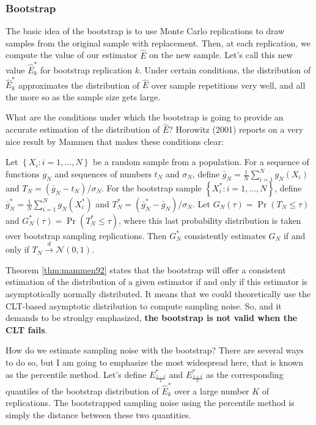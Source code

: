 \documentclass[]{book}
\theoremstyle{definition}
\theoremstyle{definition}
\theoremstyle{definition}
\theoremstyle{remark}
\let\BeginKnitrBlock\begin \let\EndKnitrBlock\end
\begin{document}
\hypertarget{bootstrap}{%
\subsubsection{Bootstrap}\label{bootstrap}}

The basic idea of the bootstrap is to use Monte Carlo replications to draw samples from the original sample with replacement.
Then, at each replication, we compute the value of our estimator \(\hat{E}\) on the new sample.
Let's call this new value \(\hat{E}^*_k\) for bootstrap replication \(k\).
Under certain conditions, the distribution of \(\hat{E}^*_k\) approximates the distribution of \(\hat{E}\) over sample repetitions very well, and all the more so as the sample size gets large.

What are the conditions under which the bootstrap is going to provide an accurate estimation of the distribution of \(\hat{E}\)?
Horowitz (2001) reports on a very nice result by Mammen that makes these conditions clear:

\BeginKnitrBlock{theorem}[Mammen (1992)]
\protect\hypertarget{thm:mammen92}{}{\label{thm:mammen92} \iffalse (Mammen (1992)) \fi{} }Let \(\left\{X_i:i=1,\dots,N\right\}\) be a random sample from a population.
For a sequence of functions \(g_N\) and sequences of numbers \(t_N\) and \(\sigma_N\), define \(\bar{g}_N=\frac{1}{N}\sum_{i=1}^Ng_N(X_i)\) and \(T_N=(\bar{g}_N-t_N)/\sigma_N\).
For the bootstrap sample \(\left\{X^*_i:i=1,\dots,N\right\}\), define \(\bar{g}^*_N=\frac{1}{N}\sum_{i=1}^Ng_N(X^*_i)\) and \(T^*_N=(\bar{g}^*_N-\bar{g}_N)/\sigma_N\).
Let \(G_N(\tau)=\Pr(T_N\leq\tau)\) and \(G^*_N(\tau)=\Pr(T^*_N\leq\tau)\), where this last probability distribution is taken over bootstrap sampling replications.
Then \(G^*_N\) consistently estimates \(G_N\) if and only if \(T_N\stackrel{d}{\rightarrow}\mathcal{N}(0,1)\).
\EndKnitrBlock{theorem}

Theorem \ref{thm:mammen92} states that the bootstrap will offer a consistent estimation of the distribution of a given estimator if and only if this estimator is asymptotically normally distributed.
It means that we could theoretically use the CLT-based asymptotic distribution to compute sampling noise.
So, and it demands to be stronlgy emphasized, \textbf{the bootstrap is not valid when the CLT fails}.

How do we estimate sampling noise with the bootstrap?
There are several ways to do so, but I am going to emphasize the most widespread here, that is known as the percentile method.
Let's define \(E^*_{\frac{1-\delta}{2}}\) and \(E^*_{\frac{1+\delta}{2}}\) as the corresponding quantiles of the bootstrap distribution of \(\hat{E}^*_k\) over a large number \(K\) of replications.
The bootstrapped sampling noise using the percentile method is simply the distance between these two quantities.
\end{document}
